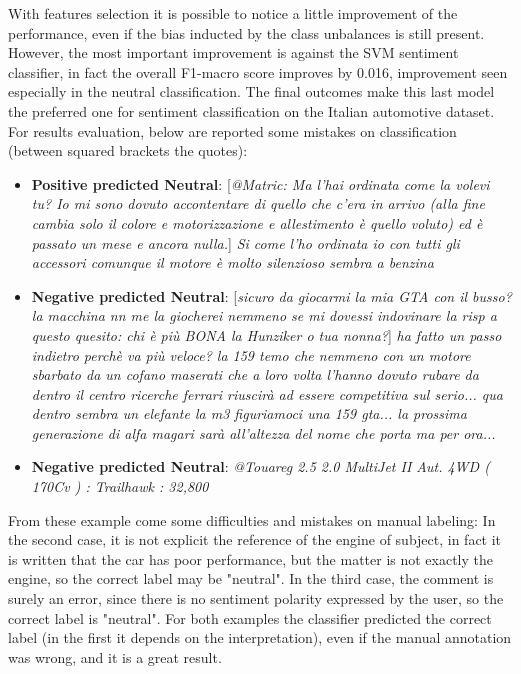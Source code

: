 With features selection it is possible to notice a little improvement of the performance, even if the bias inducted by the class unbalances is still present. However, the most important improvement is against the SVM sentiment classifier, in fact the overall F1-macro score improves by 0.016, improvement seen especially in the neutral classification. The final outcomes make this last model the preferred one for sentiment classification on the Italian automotive dataset.\\
For results evaluation, below are reported some mistakes on classification (between squared brackets the quotes):

\begin{itemize}
	\item \textbf{Positive predicted Neutral}: [\textit{@Matric: Ma l'hai ordinata come la volevi tu? Io mi sono dovuto accontentare di quello che c'era in arrivo (alla fine cambia solo il colore e motorizzazione e allestimento è quello voluto) ed è passato un mese e ancora nulla.}] \textit{Si come l'ho ordinata io con tutti gli accessori comunque il motore è molto silenzioso sembra a benzina}\\
	\item \textbf{Negative predicted Neutral}: [\textit{sicuro da giocarmi la mia GTA con il busso?la macchina nn me la giocherei nemmeno se mi dovessi indovinare la risp a questo quesito: chi è più BONA la Hunziker o tua nonna?}] \textit{ha fatto un passo indietro perchè va più veloce? la 159 temo che nemmeno con un motore sbarbato da un cofano maserati che a loro volta l'hanno dovuto rubare da dentro il centro ricerche ferrari riuscirà ad essere competitiva sul serio... qua dentro sembra un elefante la m3 figuriamoci una 159 gta... la prossima generazione di alfa magari sarà all'altezza del nome che porta ma per ora... } %
	\item \textbf{Negative predicted Neutral}: \textit{@Touareg 2.5 2.0 MultiJet II Aut. 4WD ( 170Cv ) : Trailhawk : 32,800}
\end{itemize}

From these example come some difficulties and mistakes on manual labeling: In the second case, it is not explicit the reference of the engine of subject, in fact it is written that the car has poor performance, but the matter is not exactly the engine, so the correct label may be "neutral". In the third case, the comment is surely an error, since there is no sentiment polarity expressed by the user, so the correct label is "neutral". For both examples the classifier predicted the correct label (in the first it depends on the interpretation), even if the manual annotation was wrong, and it is a great result.



